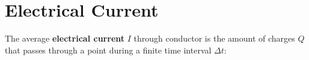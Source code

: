 %      
%
%
%
%
%
%
%
%
%
%
%
%
%
\section{Electrical Current}
The average \textbf{electrical current} $I$ through conductor is the amount of
charges $Q$ that passes through a point during a finite time interval
$\Delta t$:
%
%
%
%
%
%
